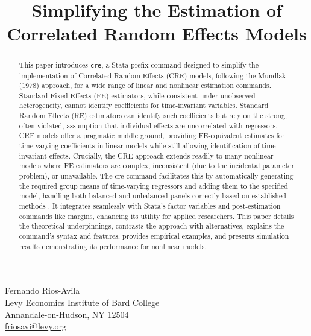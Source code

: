 \documentclass[bib]{statapress}
\begin{document}


 
\title[]{Simplifying the Estimation of Correlated Random Effects Models}


\makeatletter

\author{}{
Fernando Rios-Avila
\\
Levy Economics Institute of Bard College\\
Annandale-on-Hudson, NY 12504
\\
\href{mailto:friosavi@levy.org}{friosavi@levy.org}
}
 
 
 

\maketitle

\begin{abstract}

This paper introduces \texttt{cre}, a Stata prefix command designed to
simplify the implementation of Correlated Random Effects (CRE) models,
following the Mundlak (1978) approach, for a wide range of linear and
nonlinear estimation commands. Standard Fixed Effects (FE) estimators,
while consistent under unobserved heterogeneity, cannot identify
coefficients for time-invariant variables. Standard Random Effects (RE)
estimators can identify such coefficients but rely on the strong, often
violated, assumption that individual effects are uncorrelated with
regressors. CRE models offer a pragmatic middle ground, providing
FE-equivalent estimates for time-varying coefficients in linear models
while still allowing identification of time-invariant effects.
Crucially, the CRE approach extends readily to many nonlinear models
where FE estimators are complex, inconsistent (due to the incidental
parameter problem), or unavailable. The cre command facilitates this by
automatically generating the required group means of time-varying
regressors and adding them to the specified model, handling both
balanced and unbalanced panels correctly based on established methods
\citep{wooldridge2019}. It integrates seamlessly with Stata's factor
variables and post-estimation commands like margins, enhancing its
utility for applied researchers. This paper details the theoretical
underpinnings, contrasts the approach with alternatives, explains the
command's syntax and features, provides empirical examples, and presents
simulation results demonstrating its performance for nonlinear models.

\end{abstract}
\end{document}
